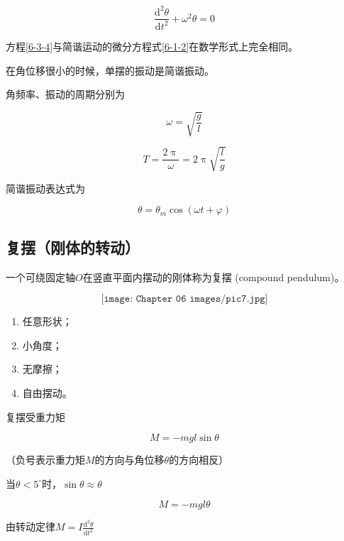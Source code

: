 \documentclass[
	12pt, %
	a4paper, %
]{myLegrandOrangeBook}
\newcommand{\degree}{^{\circ}}
\newcommand{\rmd}{\mathrm{d}}
\begin{document}
    \begin{equation}
        \frac{\rmd^2 \theta}{\rmd t^2} + \omega^2 \theta = 0
        \label{6-3-4}
    \end{equation}

    方程\ref{6-3-4}与简谐运动的微分方程式\ref{6-1-2}在数学形式上完全相同。

    在角位移很小的时候，单摆的振动是简谐振动。

    角频率、振动的周期分别为

    \begin{equation}
        \omega = \sqrt{\frac{g}{l}}
    \end{equation}

    \begin{equation}
        T = \frac{2 \uppi}{\omega} = 2 \uppi \sqrt{\frac{l}{g}}
    \end{equation}

    简谐振动表达式为

    \begin{equation}
        \theta = \theta_m \cos \left(\omega t + \varphi\right)
    \end{equation}

\subsection{复摆（刚体的转动）}

    一个可绕固定轴\(O\)在竖直平面内摆动的刚体称为复摆 (compound pendulum)。

    \[
        \texttt{[image: Chapter 06 images/pic7.jpg]}
    \]

    \begin{enumerate}
        \item 任意形状；
        \item 小角度；
        \item 无摩擦；
        \item 自由摆动。
    \end{enumerate}

    复摆受重力矩

    \[
        M = -mg l \sin \theta
    \]

    （负号表示重力矩\(M\)的方向与角位移\(\theta\)的方向相反）

    当\(\theta < 5\degree\)时，\(\sin \theta \approx \theta\)

    \[
        M = -mg l \theta
    \]

    由转动定律\(M = I \frac{\rmd^2 \theta}{\rmd t^2}\)
\end{document}
